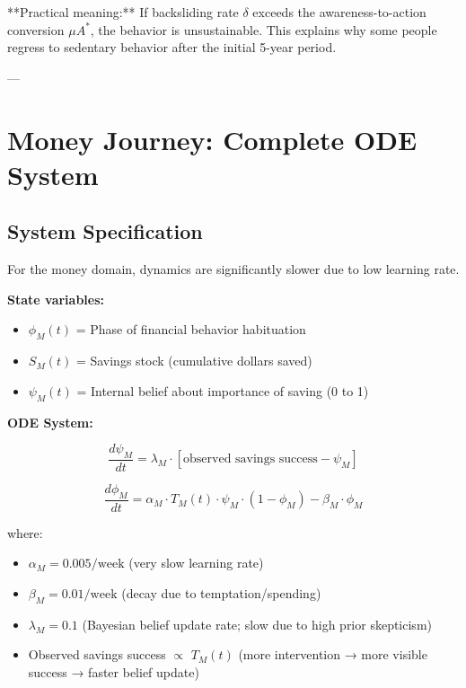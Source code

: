 **Practical meaning:** If backsliding rate $\delta$ exceeds the awareness-to-action conversion $\mu A^*$, the behavior is unsustainable. This explains why some people regress to sedentary behavior after the initial 5-year period.

---


\section{Money Journey: Complete ODE System}
\label{ooo:money}

\subsection{System Specification}

For the money domain, dynamics are significantly slower due to low learning rate.

\textbf{State variables:}
\begin{itemize}[nosep]
\item $\phi_M(t)$ = Phase of financial behavior habituation
\item $S_M(t)$ = Savings stock (cumulative dollars saved)
\item $\psi_M(t)$ = Internal belief about importance of saving (0 to 1)
\end{itemize}

\textbf{ODE System:}

\begin{equation}
\frac{d\psi_M}{dt} = \lambda_M \cdot [\text{observed savings success} - \psi_M]
\label{eq:money-belief}
\end{equation}

\begin{equation}
\frac{d\phi_M}{dt} = \alpha_M \cdot T_M(t) \cdot \psi_M \cdot (1 - \phi_M) - \beta_M \cdot \phi_M
\label{eq:money-phase}
\end{equation}

where:
\begin{itemize}[nosep]
\item $\alpha_M = 0.005 / \text{week}$ (very slow learning rate)
\item $\beta_M = 0.01 / \text{week}$ (decay due to temptation/spending)
\item $\lambda_M = 0.1$ (Bayesian belief update rate; slow due to high prior skepticism)
\item Observed savings success $\propto$ $T_M(t)$ (more intervention → more visible success → faster belief update)
\end{itemize}


